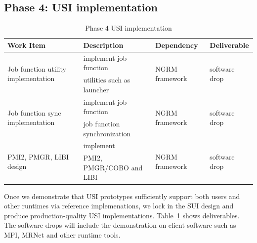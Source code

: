 \documentclass[10pt]{article}
\begin{document}
\subsection{Phase 4: USI implementation} 
\begin{table}
\centering
\begin{tabular}{|l|l|l|l|}
\hline
Work Item & Description & Dependency & Deliverable \\
\hline
\multirow{2}{*}{Job function utility implementation} & implement job function& \multirow{2}{*}{NGRM framework} & \multirow{2}{*}{software drop} \\
& utilities such as launcher & & \\ \hline
\multirow{2}{*}{Job function sync implementation} & implement job function& \multirow{2}{*}{NGRM framework} & \multirow{2}{*}{software drop} \\
& job function synchronization & & \\ \hline
\multirow{2}{*}{PMI2, PMGR, LIBI design} & implement & \multirow{2}{*}{NGRM framework} & \multirow{2}{*}{software drop} \\
& PMI2, PMGR/COBO and LIBI & & \\ \hline
\end{tabular}
\caption{Phase 4 USI implementation}
\label{tab:phase4}
\end{table}

Once we demonstrate that USI prototypes sufficiently support both users and 
other runtimes via reference implemenations, we lock in the SUI design and
produce production-quality USI implementations. Table~\ref{tab:phase4} shows
deliverables. The software drops will include the demonstration on client
software such as MPI, MRNet and other runtime tools.  



\end{document}
